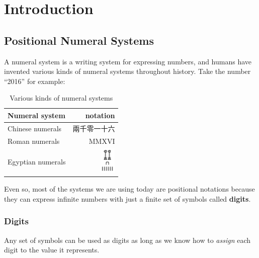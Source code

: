 \documentclass[\main/thesis.tex]{subfiles}
\begin{document}
\graphicspath{ {images/}{../images/} }

\chapter{Introduction}\label{introduction}

\section{Positional Numeral Systems}

A numeral system is a writing system for expressing numbers, and humans have
invented various kinds of numeral systems throughout history.
Take the number ``2016'' for example:

\begin{table}[H]
    \centering
        \begin{tabular}{ | l | r | }
        \textbf{Numeral system} & \textbf{notation}  \\
        \hline
        Chinese numerals    & 兩千零一十六    \\
        Roman numerals      & MMXVI         \\
        Egyptian numerals   & \includegraphics[width=2em]{egyptian/2016.png} \\
        \end{tabular}
    \caption{Various kinds of numeral systems}
    \label{table:1}
\end{table}

Even so, most of the systems we are using today are positional notations\cite{knuth1998art}
because they can express infinite numbers with just a finite set of symbols called \textbf{digits}.

\subsection{Digits}

Any set of symbols can be used as digits as long as we know how to \textit{assign}
each digit to the value it represents.
\end{document}

